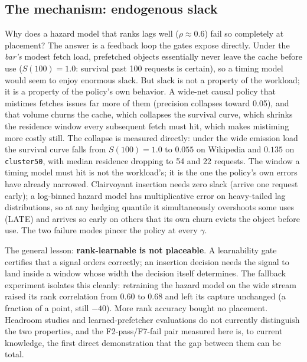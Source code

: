 \documentclass[11pt]{article}
\begin{document}
\subsection{The mechanism: endogenous slack}\label{sec:slack}
Why does a hazard model that ranks lags well ($\rho\approx0.6$) fail so completely at placement? The answer is a feedback loop the gates expose directly. Under the \emph{bar's} modest fetch load, prefetched objects essentially never leave the cache before use ($S(100){=}1.0$: survival past 100 requests is certain), so a timing model would seem to enjoy enormous slack. But slack is not a property of the workload; it is a property of the policy's own behavior. A wide-net causal policy that mistimes fetches issues far more of them (precision collapses toward 0.05), and that volume churns the cache, which collapses the survival curve, which shrinks the residence window every subsequent fetch must hit, which makes mistiming more costly still. The collapse is measured directly: under the wide emission load the survival curve falls from $S(100){=}1.0$ to $0.055$ on Wikipedia and $0.135$ on \texttt{cluster50}, with median residence dropping to 54 and 22 requests. The window a timing model must hit is not the workload's; it is the one the policy's own errors have already narrowed. Clairvoyant insertion needs zero slack (arrive one request early); a log-binned hazard model has multiplicative error on heavy-tailed lag distributions, so at any hedging quantile it simultaneously overshoots some uses (LATE) and arrives so early on others that its own churn evicts the object before use. The two failure modes pincer the policy at every $\gamma$.

The general lesson: \textbf{rank-learnable is not placeable}. A learnability gate certifies that a signal orders correctly; an insertion decision needs the signal to land inside a window whose width the decision itself determines. The fallback experiment isolates this cleanly: retraining the hazard model on the wide stream raised its rank correlation from 0.60 to 0.68 and left its capture unchanged (a fraction of a point, still $-40$). More rank accuracy bought no placement. Headroom studies and learned-prefetcher evaluations do not currently distinguish the two properties, and the F2-pass/F7-fail pair measured here is, to current knowledge, the first direct demonstration that the gap between them can be total.
\end{document}
